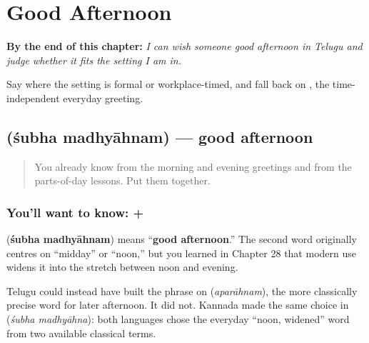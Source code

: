 
\chapter{Good Afternoon}
\label{ch:te-good-afternoon}

\begin{chapteropening}
\textbf{By the end of this chapter:} \emph{I can wish someone good afternoon in Telugu and judge whether it fits the setting I am in.}

Say   where the setting is formal or workplace-timed, and fall back on , the time-independent everyday greeting.
\end{chapteropening}

\section[\texorpdfstring{\te{శుభ} \te{మధ్యాహ్నం} (śubha madhyāhnam)}{శుభ మధ్యాహ్నం (śubha madhyāhnam)}]{  (śubha madhyāhnam) — good afternoon}

\label{lesson:TE-C31-subha-madhyahnam}



\begin{quote}
You already know \textbf{} from the morning and evening greetings and \textbf{} from the parts-of-day lessons. Put them together.
\end{quote}

\subsection*{You'll want to know:  + }
\textbf{ } (\textbf{śubha madhyāhnam}) means “\textbf{good afternoon}.” The second word originally centres on “midday” or “noon,” but you learned in Chapter 28 that modern use widens it into the stretch between noon and evening.

Telugu could instead have built the phrase on \textbf{} (\emph{aparāhnam}), the more classically precise word for later afternoon. It did not. Kannada made the same choice in \textbf{ } (\emph{śubha madhyāhna}): both languages chose the everyday “noon, widened” word from two available classical terms.

